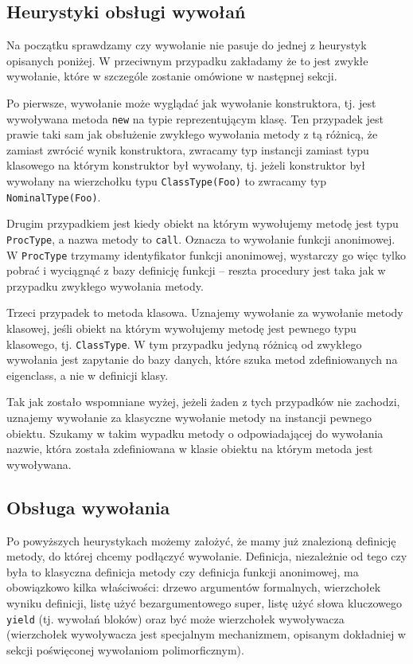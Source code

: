 \documentclass[declaration,shortabstract]{iithesis}
\begin{document}
\subsection{Heurystyki obsługi wywołań}

Na początku sprawdzamy czy wywołanie nie pasuje do jednej z heurystyk opisanych poniżej. W przeciwnym przypadku zakładamy że to jest zwykłe wywołanie, które w szczególe zostanie omówione w następnej sekcji.

Po pierwsze, wywołanie może wyglądać jak wywołanie konstruktora, tj. jest wywoływana metoda \texttt{new} na typie reprezentującym klasę. Ten przypadek jest prawie taki sam jak obsłużenie zwykłego wywołania metody z tą różnicą, że zamiast zwrócić wynik konstruktora, zwracamy typ instancji zamiast typu klasowego na którym konstruktor był wywołany, tj. jeżeli konstruktor był wywołany na wierzchołku typu \texttt{ClassType(Foo)} to zwracamy typ \texttt{NominalType(Foo)}.

Drugim przypadkiem jest kiedy obiekt na którym wywołujemy metodę jest typu \texttt{ProcType}, a nazwa metody to \texttt{call}. Oznacza to wywołanie funkcji anonimowej. W \texttt{ProcType} trzymamy identyfikator funkcji anonimowej, wystarczy go więc tylko pobrać i wyciągnąć z bazy definicję funkcji -- reszta procedury jest taka jak w przypadku zwykłego wywołania metody.

Trzeci przypadek to metoda klasowa. Uznajemy wywołanie za wywołanie metody klasowej, jeśli obiekt na którym wywołujemy metodę jest pewnego typu klasowego, tj. \texttt{ClassType}. W tym przypadku jedyną różnicą od zwykłego wywołania jest zapytanie do bazy danych, które szuka metod zdefiniowanych na eigenclass, a nie w definicji klasy.

Tak jak zostało wspomniane wyżej, jeżeli żaden z tych przypadków nie zachodzi, uznajemy wywołanie za klasyczne wywołanie metody na instancji pewnego obiektu. Szukamy w takim wypadku metody o odpowiadającej do wywołania nazwie, która została zdefiniowana w klasie obiektu na którym metoda jest wywoływana.

\subsection{Obsługa wywołania}

Po powyższych heurystykach możemy założyć, że mamy już znalezioną definicję metody, do której chcemy podłączyć wywołanie. Definicja, niezależnie od tego czy była to klasyczna definicja metody czy definicja funkcji anonimowej, ma obowiązkowo kilka właściwości: drzewo argumentów formalnych, wierzchołek wyniku definicji, listę użyć bezargumentowego super, listę użyć słowa kluczowego \texttt{yield} (tj. wywołań bloków) oraz być może wierzchołek wywoływacza (wierzchołek wywoływacza jest specjalnym mechanizmem, opisanym dokładniej w sekcji poświęconej wywołaniom polimorficznym).
\end{document}
